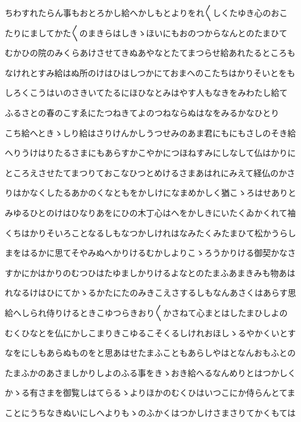\documentclass[a4paper,11pt,landscape]{ltjtarticle}
\begin{document}
\par\medskip
ちわすれたらん事もおとろかし給へかしもとよりをれ〱しくたゆき心のおこ
\par\medskip
たりにましてかた〱のまきらはしきゝほいにもおのつからなんとのたまひて
\par\medskip
むかひの院のみくらあけさせてきぬあやなとたてまつらせ給あれたるところも
\par\medskip
なけれとすみ給はぬ所のけはひはしつかにておまへのこたちはかりそいとをも
\par\medskip
しろくこうはいのさきいてたるにほひなとみはやす人もなきをみわたし給て
\par\medskip
ふるさとの春のこすゑにたつねきてよのつねならぬはなをみるかなひとり
\par\medskip
こち給へときゝしり給はさりけんかしうつせみのあま君にもにもさしのそき給
\par\medskip
へりうけはりたるさまにもあらすかこやかにつほねすみにしなして仏はかりに
\par\medskip
ところえさせたてまつりておこなひつとめけるさまあはれにみえて経仏のかさ
\par\medskip
りはかなくしたるあかのくなともをかしけになまめかしく猶こゝろはせありと
\par\medskip
みゆるひとのけはひなりあをにひの木丁心はへをかしきにいたくゐかくれて袖
\par\medskip
くちはかりそいろことなるしもなつかしけれはなみたくみたまひて松かうらし
\par\medskip
まをはるかに思てそやみぬへかりけるむかしよりこゝろうかりける御契かなさ
\par\medskip
すかにかはかりのむつひはたゆましかりけるよなとのたまふあまきみも物あは
\par\medskip
れなるけはひにてかゝるかたにたのみきこえさするしもなんあさくはあらす思
\par\medskip
給へしられ侍りけるときこゆつらきおり〱かさねて心まとはしたまひしよの
\par\medskip
むくひなとを仏にかしこまりきこゆるこそくるしけれおほしゝるやかくいとす
\par\medskip
なをにしもあらぬものをと思あはせたまふこともあらしやはとなんおもふとの
\par\medskip
たまふかのあさましかりしよのふる事をきゝおき給へるなんめりとはつかしく
\par\medskip
かゝる有さまを御覧しはてらるゝよりほかのむくひはいつこにか侍らんとてま
\par\medskip
ことにうちなきぬいにしへよりもゝのふかくはつかしけさまさりてかくもては
\par\medskip
\end{document}
